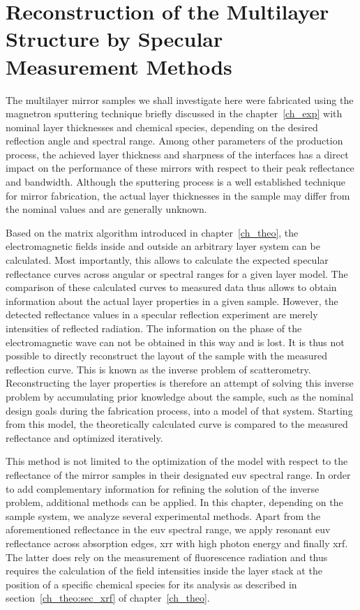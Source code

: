 
\chapter{Reconstruction of the Multilayer Structure by Specular Measurement Methods} \label{ch_spec}
The multilayer mirror samples we shall investigate here were fabricated using the magnetron sputtering technique briefly discussed in the chapter~\ref{ch_exp} with nominal layer thicknesses and chemical species, depending on the desired reflection angle and spectral range. Among other parameters of the production process, the achieved layer thickness and sharpness of the interfaces has a direct impact on the performance of these mirrors with respect to their peak reflectance and bandwidth. Although the sputtering process is a well established technique for mirror fabrication, the actual layer thicknesses in the sample may differ from the nominal values and are generally unknown.

Based on the matrix algorithm introduced in chapter~\ref{ch_theo}, the electromagnetic fields   inside and outside an arbitrary layer system can be calculated. Most importantly, this allows to calculate the expected specular reflectance curves across angular or spectral ranges for a given layer model. The comparison of these calculated curves to measured data thus allows to obtain information about the actual layer properties in a given sample. However, the detected reflectance values in a specular reflection experiment are merely intensities of reflected radiation. The information on the phase of the electromagnetic wave can not be obtained in this way and is lost. It is thus not possible to directly reconstruct the layout of the sample with the measured reflection curve. This is known as the inverse problem of scatterometry. Reconstructing the layer properties is therefore an attempt of solving this inverse problem by accumulating prior knowledge about the sample, such as the nominal design goals during the fabrication process, into a model of that system. Starting from this model, the theoretically calculated curve is compared to the measured reflectance and optimized iteratively.

This method is not limited to the optimization of the model with respect to the reflectance of the mirror samples in their designated \gls{euv} spectral range. In order to add complementary information for refining the solution of the inverse problem, additional methods can be applied. In this chapter, depending on the sample system, we analyze several experimental methods. Apart from the aforementioned reflectance in the \gls{euv} spectral range, we apply resonant \gls{euv} reflectance across absorption edges, \gls{xrr} with high photon energy and finally \gls{xrf}. The latter does rely on the measurement of fluorescence radiation and thus requires the calculation of the field intensities inside the layer stack at the position of a specific chemical species for its analysis as described in section~\ref{ch_theo:sec_xrf} of chapter~\ref{ch_theo}.


